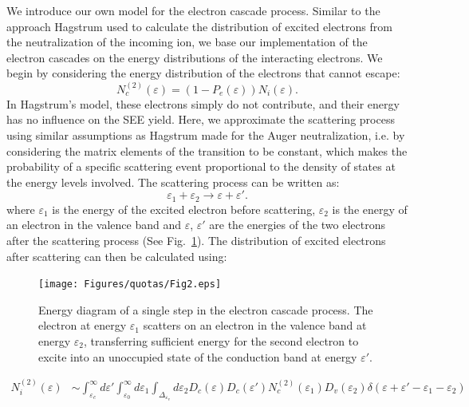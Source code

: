 \begin{refsection}
We introduce our own model for the electron cascade process. Similar to the approach Hagstrum used to calculate the distribution of excited electrons from the neutralization of the incoming ion, we base our implementation of the electron cascades on the energy distributions of the interacting electrons. We begin by considering the energy distribution of the electrons that cannot escape:
\begin{equation}
N_c^{(2)}(\varepsilon) = (1-P_e(\varepsilon))N_i(\varepsilon).
\end{equation}
In Hagstrum's model, these electrons simply do not contribute, and their energy has no influence on the SEE yield. Here, we approximate the scattering process using similar assumptions as Hagstrum made for the Auger neutralization, i.e. by considering the matrix elements of the transition to be constant, which makes the probability of a specific scattering event proportional to the density of states at the energy levels involved. The scattering process can be written as:
\begin{equation}\label{quotas:eq-scattering}
\varepsilon_1 + \varepsilon_2 \rightarrow \varepsilon + \varepsilon'.
\end{equation}
where $\varepsilon_1$ is the energy of the excited electron before scattering, $\varepsilon_2$ is the energy of an electron in the valence band and $\varepsilon$, $\varepsilon'$ are the energies of the two electrons after the scattering process (See Fig.~\ref{quotas:fig-cascades}). The distribution of excited electrons after scattering can then be calculated using:
\begin{figure}[ht]
\centering
\texttt{[image: Figures/quotas/Fig2.eps]}
\caption{\label{quotas:fig-cascades}Energy diagram of a single step in the electron cascade process. The electron at energy $\varepsilon_1$ scatters on an electron in the valence band at energy $\varepsilon_2$, transferring sufficient energy for the second electron to excite into an unoccupied state of the conduction band at energy $\varepsilon'$.}
\end{figure}
\begin{equation}
\begin{aligned}
N_i^{(2)}(\varepsilon) &\sim \int_{\varepsilon_c}^{\infty} d\varepsilon' \int_{\varepsilon_0}^{\infty} d\varepsilon_1 \int_{\Delta_{\varepsilon_v}} d\varepsilon_2  D_c(\varepsilon) D_c(\varepsilon') N_c^{(2)}(\varepsilon_1) D_v(\varepsilon_2)  \delta(\varepsilon + \varepsilon' -\varepsilon_1 - \varepsilon_2) \\

\end{aligned}
\end{equation}
\end{refsection}
